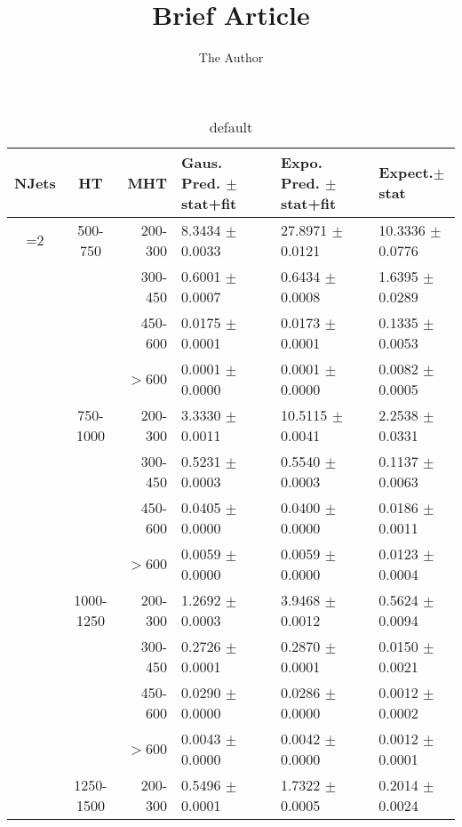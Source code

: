 \documentclass[11pt]{amsart}
\title{Brief Article}
\author{The Author}
\begin{document}
\maketitle

\begin{table}[htdp]
\caption{default}
\begin{center}
\begin{tabular}{|c|c|r|l|l|l|}
\hline

NJets & 	HT 	& MHT 		& Gaus. Pred. $\pm$ stat+fit	& Expo. Pred. $\pm$stat+fit	& Expect.$\pm$stat\\
\hline
=2 & 500-750 	&  200-300 & 	8.3434 $\pm$ 0.0033  & 	27.8971 $\pm$ 0.0121  & 	10.3336 $\pm$ 0.0776 \\
	&				& 300-450 	& 	0.6001 $\pm$ 0.0007  & 	0.6434 $\pm$ 0.0008  & 	1.6395 $\pm$ 0.0289 \\
  	& 				& 450-600 	& 	0.0175 $\pm$ 0.0001  & 	0.0173 $\pm$ 0.0001  & 	0.1335 $\pm$ 0.0053 \\
	&				& $>$600 	& 	0.0001 $\pm$ 0.0000  & 	0.0001 $\pm$ 0.0000  & 	0.0082 $\pm$ 0.0005 \\
	& 750-1000 	&  200-300 & 	3.3330 $\pm$ 0.0011  & 	10.5115 $\pm$ 0.0041  & 	2.2538 $\pm$ 0.0331 \\
  	&				& 300-450 	& 	0.5231 $\pm$ 0.0003  & 	0.5540 $\pm$ 0.0003  & 	0.1137 $\pm$ 0.0063 \\
  	&				& 450-600 	& 	0.0405 $\pm$ 0.0000  & 	0.0400 $\pm$ 0.0000  & 	0.0186 $\pm$ 0.0011 \\
  	&				& $>$600 	& 	0.0059 $\pm$ 0.0000  & 	0.0059 $\pm$ 0.0000  & 	0.0123 $\pm$ 0.0004 \\
  	& 1000-1250 & 200-300 & 	1.2692 $\pm$ 0.0003  & 	3.9468 $\pm$ 0.0012  & 	0.5624 $\pm$ 0.0094 \\
  	&				& 300-450 & 	0.2726 $\pm$ 0.0001  & 	0.2870 $\pm$ 0.0001  & 	0.0150 $\pm$ 0.0021 \\
  	&				& 450-600 & 	0.0290 $\pm$ 0.0000  & 	0.0286 $\pm$ 0.0000  & 	0.0012 $\pm$ 0.0002 \\
  	&				& $>$600 & 	0.0043 $\pm$ 0.0000  & 	0.0042 $\pm$ 0.0000  & 	0.0012 $\pm$ 0.0001 \\
  	& 1250-1500	& 200-300 & 	0.5496 $\pm$ 0.0001  & 	1.7322 $\pm$ 0.0005  & 	0.2014 $\pm$ 0.0024 \\

\end{tabular}
\end{center}
\end{table}
\end{document}
